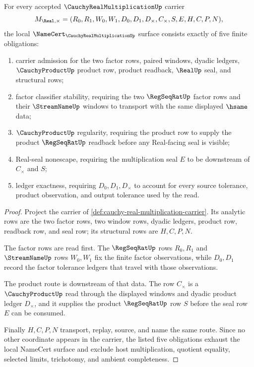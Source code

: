 \begin{theorem}
\label{thm:cauchy-real-multiplication-namecert-obligations}
For every accepted $\CauchyRealMultiplicationUp$ carrier
$$
M_{\Real,\times}=(R_0,R_1,W_0,W_1,D_0,D_1,D_\times,C_\times,S,E,H,C,P,N),
$$
the local $\NameCert_{\CauchyRealMultiplicationUp}$ surface consists exactly of five finite obligations:
\begin{enumerate}
\item carrier admission for the two factor rows, paired windows, dyadic ledgers, $\CauchyProductUp$ product row, product readback, $\RealUp$ seal, and structural rows;
\item factor classifier stability, requiring the two $\RegSeqRatUp$ factor rows and their $\StreamNameUp$ windows to transport with the same displayed $\hsame$ data;
\item $\CauchyProductUp$ regularity, requiring the product row to supply the product $\RegSeqRatUp$ readback before any Real-facing seal is visible;
\item Real-seal nonescape, requiring the multiplication seal $E$ to be downstream of $C_\times$ and $S$;
\item ledger exactness, requiring $D_0,D_1,D_\times$ to account for every source tolerance, product observation, and output tolerance used by the read.
\end{enumerate}
\end{theorem}
\begin{proof}
Project the carrier of \autoref{def:cauchy-real-multiplication-carrier}. Its analytic rows are the two factor rows, two window rows, dyadic ledgers, product row, readback row, and seal row; its structural rows are $H,C,P,N$.

The factor rows are read first. The $\RegSeqRatUp$ rows $R_0,R_1$ and $\StreamNameUp$ rows $W_0,W_1$ fix the finite factor observations, while $D_0,D_1$ record the factor tolerance ledgers that travel with those observations.

The product route is downstream of that data. The row $C_\times$ is a $\CauchyProductUp$ read through the displayed windows and dyadic product ledger $D_\times$, and it supplies the product $\RegSeqRatUp$ row $S$ before the seal row $E$ can be consumed.

Finally $H,C,P,N$ transport, replay, source, and name the same route. Since no other coordinate appears in the carrier, the listed five obligations exhaust the local NameCert surface and exclude host multiplication, quotient equality, selected limits, trichotomy, and ambient completeness.
\end{proof}

